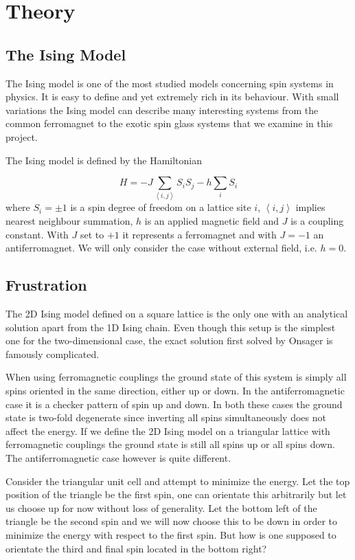 \documentclass[paper=a4, fontsize=11pt]{scrartcl} %
\numberwithin{equation}{section} %
\numberwithin{figure}{section} %
\numberwithin{table}{section} %
\begin{document}
\section{Theory}
\label{sec:theory}

\subsection{The Ising Model}

The Ising model is one of the most studied models concerning spin systems in physics. It is easy to define and yet extremely rich in its behaviour. With small variations the Ising model can describe many interesting systems from the common ferromagnet to the exotic spin glass systems that we examine in this project.

The Ising model is defined by the Hamiltonian

\begin{equation}
H = -J \sum\limits_{\left\langle i,j \right\rangle} S_{i} S_{j} -h \sum\limits_{i} S_{i}
\end{equation}
where $S_{i} = \pm 1$ is a spin degree of freedom on a lattice site $i$, $\left< i,j \right> $ implies nearest neighbour summation, $h$ is an applied magnetic field and $J$ is a coupling constant. With $J$ set to $+1$ it represents a ferromagnet and with $J=-1$ an antiferromagnet. We will only consider the case without external field, i.e. $h=0$.

\subsection{Frustration}
The 2D Ising model defined on a square lattice is the only one with an analytical solution apart from the 1D Ising chain. Even though this setup is the simplest one for the two-dimensional case, the exact solution first solved by Onsager is famously complicated\cite{onsager}.

When using ferromagnetic couplings the ground state of this system is simply all spins oriented in the same direction, either up or down. In the antiferromagnetic case it is a checker pattern of spin up and down. In both these cases the ground state is two-fold degenerate since inverting all spins simultaneously does not affect the energy. If we define the 2D Ising model on a triangular lattice with ferromagnetic couplings the ground state is still all spins up or all spins down. The antiferromagnetic case however is quite different.

Consider the triangular unit cell and attempt to minimize the energy. Let the top position of the triangle be the first spin, one can orientate this arbitrarily but let us choose up for now without loss of generality. Let the bottom left of the triangle be the second spin and we will now choose this to be down in order to minimize the energy with respect to the first spin. But how is one supposed to orientate the third and final spin located in the bottom right? 
\end{document}
